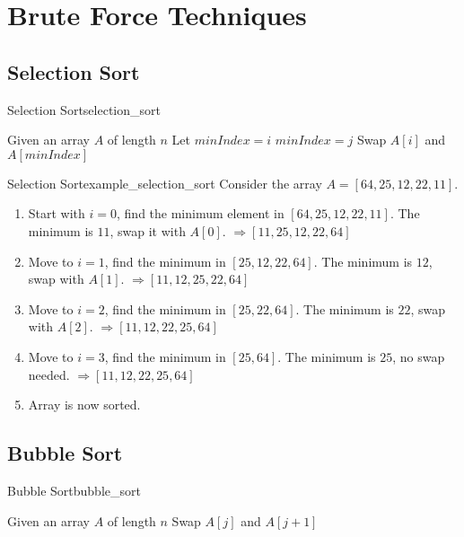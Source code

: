 \chapter{Brute Force Techniques}
\section{Selection Sort}
\begin{algorithmtcb}
    {Selection Sort}{selection_sort}
    \begin{algorithmic}
        \State Given an array $A$ of length $n$
            \State Let $minIndex = i$
                    \State $minIndex = j$
                \EndIf
            \EndFor
            \State Swap $A[i]$ and $A[minIndex]$
        \EndFor 
    \end{algorithmic}
\end{algorithmtcb}

\begin{exampletcb}
    {Selection Sort}{example_selection_sort}
    Consider the array $A = [64, 25, 12, 22, 11]$.

    \begin{enumerate}
        \item Start with $i = 0$, find the minimum element in $[64, 25, 12, 22, 11]$. The minimum is $11$, swap it with $A[0]$.
            \newline $\Rightarrow [11, 25, 12, 22, 64]$
        \item Move to $i = 1$, find the minimum in $[25, 12, 22, 64]$. The minimum is $12$, swap with $A[1]$.
            \newline $\Rightarrow [11, 12, 25, 22, 64]$
        \item Move to $i = 2$, find the minimum in $[25, 22, 64]$. The minimum is $22$, swap with $A[2]$.
            \newline $\Rightarrow [11, 12, 22, 25, 64]$
        \item Move to $i = 3$, find the minimum in $[25, 64]$. The minimum is $25$, no swap needed.
            \newline $\Rightarrow [11, 12, 22, 25, 64]$
        \item Array is now sorted.
    \end{enumerate}
\end{exampletcb}


\section{Bubble Sort}
\begin{algorithmtcb}
    {Bubble Sort}{bubble_sort}
    \begin{algorithmic}
        \State Given an array $A$ of length $n$
                    \State Swap $A[j]$ and $A[j+1]$
                \EndIf
            \EndFor
        \EndFor
    \end{algorithmic}
\end{algorithmtcb}

